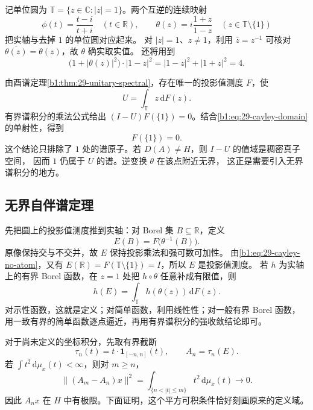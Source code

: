 记单位圆为 \(\mathbb T=\{z\in\mathbb C:|z|=1\}\)。两个互逆的连续映射
\begin{equation}\label{b1:eq:29-cayley-maps}
 \phi(t)=\frac{t-i}{t+i}\quad(t\in\mathbb R),\qquad
 \theta(z)=i\frac{1+z}{1-z}\quad(z\in\mathbb T\setminus\{1\})
\end{equation}
把实轴与去掉 \(1\) 的单位圆对应起来。
对 \(|z|=1\)、\(z\ne1\)，利用 \(\overline z=z^{-1}\) 可核对
\(\overline{\theta(z)}=\theta(z)\)，故 \(\theta\) 确实取实值。
还将用到
\begin{equation}\label{b1:eq:29-cayley-weight}
 \bigl(1+|\theta(z)|^2\bigr)\cdot|1-z|^2
 =|1-z|^2+|1+z|^2=4.
\end{equation}

由酉谱定理\cref{b1:thm:29-unitary-spectral}，存在唯一的投影值测度 \(F\)，使
\[
 U=\int_{\mathbb T}z\,\mathrm dF(z).
\]
有界谱积分的乘法公式给出
\((I-U)F(\{1\})=0\)。结合\eqref{b1:eq:29-cayley-domain}的单射性，得到
\begin{equation}\label{b1:eq:29-cayley-no-atom}
 F(\{1\})=0.
\end{equation}
这个结论只排除了 \(1\) 处的谱原子。若 \(D(A)\ne H\)，则 \(I-U\) 的值域是稠密真子空间，
因而 \(1\) 仍属于 \(U\) 的谱。逆变换 \(\theta\) 在该点附近无界，
这正是需要引入无界谱积分的地方。

\subsection{无界自伴谱定理}
\label{b1:subsec:290602}

先把圆上的投影值测度推到实轴：对 Borel 集 \(B\subseteq\mathbb R\)，定义
\begin{equation}\label{b1:eq:29-real-spectral-measure}
 E(B)=F\bigl(\theta^{-1}(B)\bigr).
\end{equation}
原像保持交与不交并，故 \(E\) 保持投影乘法和强可数可加性。
由\eqref{b1:eq:29-cayley-no-atom}，又有
\(E(\mathbb R)=F(\mathbb T\setminus\{1\})=I\)，所以 \(E\) 是投影值测度。
若 \(h\) 为实轴上的有界 Borel 函数，在 \(z=1\) 处把 \(h\circ\theta\) 任意补成有限值，则
\begin{equation}\label{b1:eq:29-cayley-pushforward}
 h(E)=\int_{\mathbb T}h(\theta(z))\,\mathrm dF(z).
\end{equation}
对示性函数，这就是定义；对简单函数，利用线性性；对一般有界 Borel 函数，
用一致有界的简单函数逐点逼近，再用有界谱积分的强收敛结论即可。

对于尚未定义的坐标积分，先取有界截断
\[
 \tau_n(t)=t\cdot\mathbf1_{[-n,n]}(t),\qquad A_n=\tau_n(E).
\]
若 \(\int t^2\,\mathrm d\mu_x(t)<\infty\)，则对 \(m\ge n\)，
\[
 \|(A_m-A_n)x\|^2
 =\int_{\{n<|t|\le m\}}t^2\,\mathrm d\mu_x(t)\longrightarrow0.
\]
因此 \(A_nx\) 在 \(H\) 中有极限。下面证明，这个平方可积条件恰好刻画原来的定义域。


